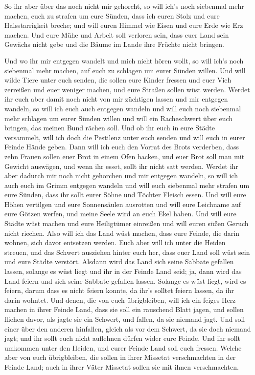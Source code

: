  So ihr aber über das noch nicht mir gehorcht, so will
ich's noch siebenmal mehr machen, euch zu strafen um eure Sünden,
 dass ich euren Stolz und eure Halsstarrigkeit breche;
und will euren Himmel wie Eisen und eure Erde wie Erz machen.
 Und eure Mühe und Arbeit soll verloren sein, dass euer
Land sein Gewächs nicht gebe und die Bäume im Lande ihre Früchte nicht
bringen.

 Und wo ihr mir entgegen wandelt und mich nicht hören
wollt, so will ich's noch siebenmal mehr machen, auf euch zu schlagen um
eurer Sünden willen.  Und will wilde Tiere unter euch
senden, die sollen eure Kinder fressen und euer Vieh zerreißen und euer
weniger machen, und eure Straßen sollen wüst werden. 
Werdet ihr euch aber damit noch nicht von mir züchtigen lassen und mir
entgegen wandeln,  so will ich euch auch entgegen wandeln
und will euch noch siebenmal mehr schlagen um eurer Sünden willen
 und will ein Racheschwert über euch bringen, das meinen
Bund rächen soll. Und ob ihr euch in eure Städte versammelt, will ich
doch die Pestilenz unter euch senden und will euch in eurer Feinde Hände
geben.  Dann will ich euch den Vorrat des Brots
verderben, dass zehn Frauen sollen euer Brot in einem Ofen backen, und
euer Brot soll man mit Gewicht auswägen, und wenn ihr esset, sollt ihr
nicht satt werden.  Werdet ihr aber dadurch mir noch
nicht gehorchen und mir entgegen wandeln,  so will ich
auch euch im Grimm entgegen wandeln und will euch siebenmal mehr strafen
um eure Sünden,  dass ihr sollt eurer Söhne und Töchter
Fleisch essen.  Und will eure Höhen vertilgen und eure
Sonnensäulen ausrotten und will eure Leichname auf eure Götzen werfen,
und meine Seele wird an euch Ekel haben.  Und will eure
Städte wüst machen und eure Heiligtümer einreißen und will euren süßen
Geruch nicht riechen.  Also will ich das Land wüst
machen, dass eure Feinde, die darin wohnen, sich davor entsetzen werden.
 Euch aber will ich unter die Heiden streuen, und das
Schwert ausziehen hinter euch her, dass euer Land soll wüst sein und
eure Städte verstört.  Alsdann wird das Land sich seine
Sabbate gefallen lassen, solange es wüst liegt und ihr in der Feinde
Land seid; ja, dann wird das Land feiern und sich seine Sabbate gefallen
lassen.  Solange es wüst liegt, wird es feiern, darum
dass es nicht feiern konnte, da ihr's solltet feiern lassen, da ihr
darin wohntet.  Und denen, die von euch übrigbleiben,
will ich ein feiges Herz machen in ihrer Feinde Land, dass sie soll ein
rauschend Blatt jagen, und sollen fliehen davor, als jagte sie ein
Schwert, und fallen, da sie niemand jagt.  Und soll einer
über den anderen hinfallen, gleich als vor dem Schwert, da sie doch
niemand jagt; und ihr sollt euch nicht auflehnen dürfen wider eure
Feinde.  Und ihr sollt umkommen unter den Heiden, und
eurer Feinde Land soll euch fressen.  Welche aber von
euch übrigbleiben, die sollen in ihrer Missetat verschmachten in der
Feinde Land; auch in ihrer Väter Missetat sollen sie mit ihnen
verschmachten.


